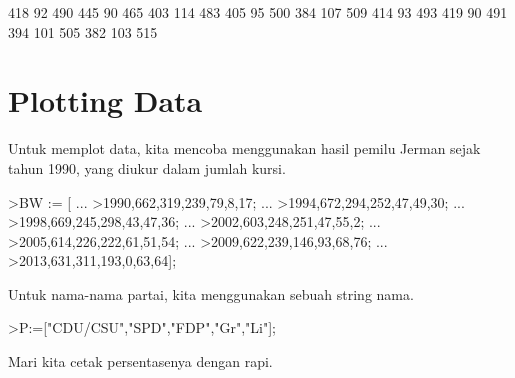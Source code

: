 \documentclass{article}
\newenvironment{eulernotebook}{\par}{\par}
\newcommand{\eulerheading}[1]{\section{#1}}
\newenvironment{eulercomment}{\par\medskip}{\par\medskip}
\begin{document}
\begin{eulernotebook}
\begin{euleroutput}
            418            92           490 
            445            90           465 
            403           114           483 
            405            95           500 
            384           107           509 
            414            93           493 
            419            90           491 
            394           101           505 
            382           103           515 
\end{euleroutput}
\eulerheading{Plotting Data}
\begin{eulercomment}
Untuk memplot data, kita mencoba menggunakan hasil pemilu Jerman sejak
tahun 1990, yang diukur dalam jumlah kursi.
\end{eulercomment}
\begin{eulerprompt}
>BW := [ ...
>1990,662,319,239,79,8,17; ...
>1994,672,294,252,47,49,30; ...
>1998,669,245,298,43,47,36; ...
>2002,603,248,251,47,55,2; ...
>2005,614,226,222,61,51,54; ...
>2009,622,239,146,93,68,76; ...
>2013,631,311,193,0,63,64];
\end{eulerprompt}
\begin{eulercomment}
Untuk nama-nama partai, kita menggunakan sebuah string nama.
\end{eulercomment}
\begin{eulerprompt}
>P:=["CDU/CSU","SPD","FDP","Gr","Li"];
\end{eulerprompt}
\begin{eulercomment}
Mari kita cetak persentasenya dengan rapi.


\end{eulercomment}
\end{eulernotebook}
\end{document}
